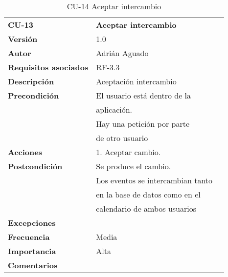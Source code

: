 \begin{table}
\begin{tabular}{llr}  
\toprule
\begin{minipage}[b]{0.24\columnwidth}\raggedright\strut
\textbf{CU-13}\strut
\end{minipage} & \begin{minipage}[b]{0.72\columnwidth}\raggedright\strut
\textbf{Aceptar intercambio}\strut
\end{minipage}\tabularnewline
\cmidrule(r){1-2}
\textbf{Versión}       & 1.0           \\
\textbf{Autor}       & Adrián  Aguado    \\
\textbf{Requisitos asociados}       & RF-3.3 \\
\textbf{Descripción} & Aceptación intercambio \\
\textbf{Precondición}  & El usuario está dentro de la \\
& aplicación.      \\
& Hay una petición por parte \\
& de otro usuario \\
\textbf{Acciones} & 1. Aceptar cambio. \\
\textbf{Postcondición} & Se produce el cambio. \\
& Los eventos se intercambian tanto \\
& en la base de datos como en el \\
& calendario de ambos usuarios \\
\textbf{Excepciones} &     \\
\textbf{Frecuencia} & Media          \\
\textbf{Importancia} & Alta            \\
\textbf{Comentarios } &   \\
\bottomrule
\end{tabular}
\caption{CU-14 Aceptar intercambio} 
\end{table}

